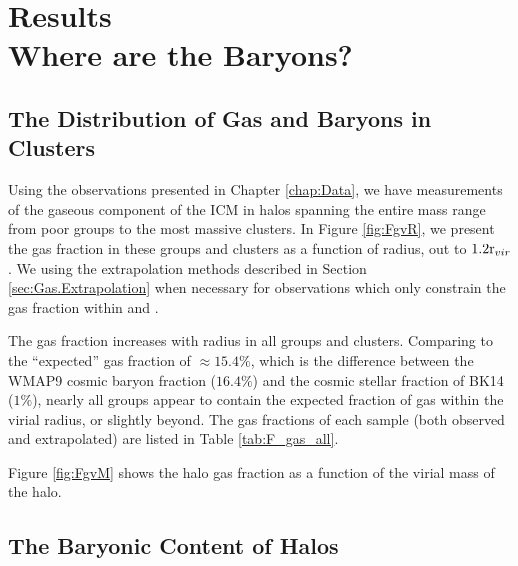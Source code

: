 \chapter{Results\\Where are the Baryons?}
\label{chap:Results}

\section{The Distribution of Gas and Baryons in Clusters}
\label{sec:Spatial}

Using the observations presented in Chapter \ref{chap:Data}, we have
measurements of the gaseous component of the ICM in halos spanning the
entire mass range from poor groups to the most massive clusters. In
Figure \ref{fig:FgvR}, we present the gas fraction in these groups and
clusters as a function of radius, out to $1.2\textrm{r\ensuremath{_{vir}}}{}$. We using the
extrapolation methods described in Section \ref{sec:Gas.Extrapolation}
when necessary for observations which only constrain the gas fraction
within \rfive{} and \rtwo{}. 



The gas fraction increases with radius in all groups and
clusters. Comparing to the ``expected'' gas fraction of $\approx
15.4\%$, which is the difference between the WMAP9 cosmic baryon
fraction ($16.4\%$) and the cosmic stellar fraction of BK14 ($1\%$),
nearly all groups appear to contain the expected fraction of gas
within the virial radius, or slightly beyond. The gas fractions of
each sample (both observed and extrapolated) are listed in Table
\ref{tab:F_gas_all}.

 

Figure \ref{fig:FgvM} shows the halo gas fraction as a function of the
virial mass of the halo. 




\section{The Baryonic Content of Halos}
\label{sec:Baryonic}
